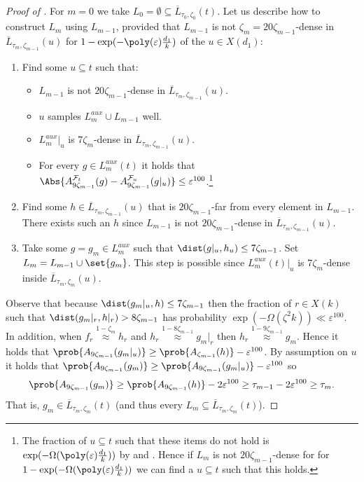 \begin{proof}[Proof of ]
    For \(m=0\) we take \(L_0 =\emptyset \subseteq \overline{L}_{\tau_0,\zeta_0}(t)\). Let us describe how to construct \(L_m\) using \(L_{m-1}\), provided that \(L_{m-1}\) is not \(\zeta_m=20\zeta_{m-1}\)-dense in \(\overline{L}_{\tau_{m},\zeta_{m-1}}(u)\) for \(1-\exp(-\poly(\varepsilon)\frac{d_1}{k})\) of the \(u \in X(d_1)\):
        \begin{enumerate}
            \item Find some \(u \subseteq t\) such that:
            \begin{itemize}
                \item \(L_{m-1}\) is not \(20\zeta_{m-1}\)-dense in \(\overline{L}_{\tau_{m},\zeta_{m-1}}(u)\).
                \item \(u\) samples \(L^{aux}_{m} \cup L_{m-1}\) well.
                \item \(L^{aux}_{m}|_u\) is \(7\zeta_{m}\)-dense in \(\overline{L}_{\tau_{m},\zeta_{m-1}}(u)\). 
                \item For every \(g \in L^{aux}_{m}(t)\) it holds that \(\Abs{A_{9\zeta_{m-1}}^{\mathcal{F}_t}(g) - A_{9\zeta_{m-1}}^{\mathcal{F}_u}(g|_u) }\leq \varepsilon^{100}\).\footnote{The fraction of \(u \subseteq t\) such that these items do not hold is \(\exp(-\Omega(\poly(\varepsilon)\frac{d_1}{k}))\) by  and . Hence if \(L_m\) is not \(20\zeta_{m-1}\)-dense for for \(1-\exp(-\Omega(\poly(\varepsilon)\frac{d_1}{k}))\) we can find a \(u \subseteq t\) such that this holds.}
            \end{itemize} 
            \item Find some \(h \in \overline{L}_{\tau_{m},\zeta_{m-1}}(u)\) that is \(20\zeta_{m-1}\)-far from every element in \(L_{m-1}\). There exists such an \(h\) since \(L_{m-1}\) is not \(20\zeta_{m-1}\)-dense in \(\overline{L}_{\tau_{m},\zeta_{m-1}}(u)\).
            \item Take some \(g=g_{m} \in L^{aux}_{m}\) such that \(\dist(g|_u,h_u) \leq 7\zeta_{m-1}\). Set \(L_{m} = L_{m-1} \cup \set{g_{m}}\). This step is possible since \(L^{aux}_{m}(t)|_u\) is \(7\zeta_{m}\)-dense inside \(\overline{L}_{\tau_{m},\zeta_{m}}(u)\).
        \end{enumerate}
    Observe that because \(\dist(g_{m}|_u,h) \leq 7\zeta_{m-1}\) then the fraction of \(r \in X(k)\) such that \(\dist(g_{m}|_r,h|_r) > 8\zeta_{m-1}\) has probability \(\exp(-\Omega(\zeta^2 k)) \ll \varepsilon^{100}\). In addition, when \(f_r \overset{1-\zeta_m}{\approx} h_r\) and \(h_r \overset{1-8\zeta_{m-1}}{\approx} g_{m}|_r\) then \(h_r \overset{1-9\zeta_{m-1}}{\approx} g_{m}\). Hence it holds that \(\prob{A_{9\zeta_{m-1}}(g_{m}|_u)} \geq \prob{A_{\zeta_{m-1}}(h)} - \varepsilon^{100}\). By assumption on \(u\) it holds that \(\prob{A_{9\zeta_{m-1}}(g_{m})} \geq \prob{A_{9\zeta_{m-1}}(g_{m}|_u)} -\varepsilon^{100}\) so
    \[\prob{A_{9\zeta_{m-1}}(g_{m})} \geq \prob{A_{9\zeta_{m-1}}(h)} - 2\varepsilon^{100} \geq \tau_{m-1}-2\varepsilon^{100}\geq \tau_{m}.\]
    That is, \(g_{m} \in \overline{L}_{\tau_{m},\zeta_{m}}(t)\) (and thus every \(L_m \subseteq \overline{L}_{\tau_{m},\zeta_{m}}(t)\)).


\end{proof}
